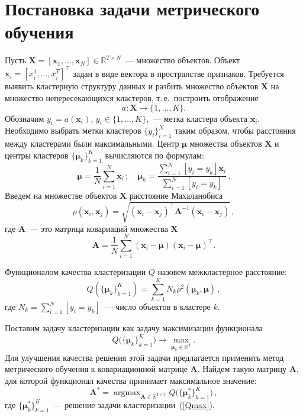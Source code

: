\documentclass[12pt,twoside]{article}
\newcommand{\x}{\mathbf{x}}
\begin{document}
\section{Постановка задачи метрического обучения}
Пусть $\mathbf{X} = [\x_1, \ldots, \x_N] \in \mathbb{R}^{T \times N}$~--- множество объектов.
Объект $\mathbf{x}_i = [x_i^1, \ldots, x_i^T]^\top$ задан в виде вектора в пространстве признаков.
Требуется выявить кластерную структуру данных и разбить множество объектов $\mathbf{X}$ на множество непересекающихся кластеров,
т.\,е.\ построить отображение
\[
    a: \mathbf{X} \to \{1, \dots, K\}.
\]
Обозначим $y_i = a (\x_i)$, $y_i \in \{1, \ldots, K\}$,~--- метка кластера объекта $\x_i$.
Необходимо выбрать метки кластеров $\{y_i\}_{i=1}^N$ таким образом, чтобы расстояния между кластерами были максимальными.
Центр $\boldsymbol{\mu}$ множества объектов $\mathbf{X}$ и центры кластеров $\{\boldsymbol{\mu}_k\}_{k=1}^K$ вычисляются по формулам:
\begin{equation}
    \label{mu}
    \boldsymbol{\mu} =\frac1N \sum_{i=1}^N\x_i\,; \quad
    \boldsymbol{\mu}_k =\frac{ \sum_{i=1}^N [y_i = y_k]\mathbf{x}_i } {\sum_{i=1}^N [y_i = y_k]}\,.
\end{equation}
Введем на множестве объектов $\mathbf{X}$ расстояние Махаланобиса
\begin{equation}
    \label{metric}
    \rho (\x_i, \x_j) = \sqrt{(\x_i - \x_j)^{\top} \mathbf{A}^{-1} (\x_i - \x_j)}\,,
\end{equation}
где $\mathbf{A}$~--- это матрица ковариаций множества $\mathbf{X}$
\begin{equation}
\label{covMatrix}
    \mathbf{A} = \frac 1N \sum_{i=1}^N(\x_i - \boldsymbol{\mu})(\x_i - \boldsymbol{\mu})^{\top}.
\end{equation}
\begin{Def}
Функционалом качества кластеризации $Q$ назовем межкластерное расстояние:
\[
    Q (\{\boldsymbol{\mu}_k\}_{k=1}^K)= \sum_{k=1}^K N_k \rho^2(\boldsymbol{\mu}_k, \boldsymbol{\mu})\,,
\]
где $N_k = \sum_{i=1}^N [y_i = y_k]$~--- число объектов в кластере $k$.
\end{Def}

Поставим задачу кластеризации как задачу максимизации функционала
\begin{equation}
\label{Qmax}
    Q \bigl(\{\boldsymbol{\mu}_k\}_{k=1}^K\bigr) \to \max_{\boldsymbol{\mu}_k \in \mathbb{R}^T}.
\end{equation}
Для улучшения качества решения этой задачи предлагается применить метод метрического обучения к ковариационной матрице $\mathbf{A}$.
Найдем такую матрицу $\mathbf{A}$, для которой функционал качества принимает максимальное значение:
\begin{equation}
\label{Amax}
    \mathbf{A}^* = \mathop{\arg \max}_{\mathbf{A} \in \mathbb{R}^{T \times T}} Q \bigl(\{\boldsymbol{\mu}_k^*\}_{k=1}^K \bigr)\,,
\end{equation}
где $\{\boldsymbol{\mu}_k^*\}_{k=1}^K$~--- решение задачи кластеризации~(\ref{Qmax}).
\end{document}
